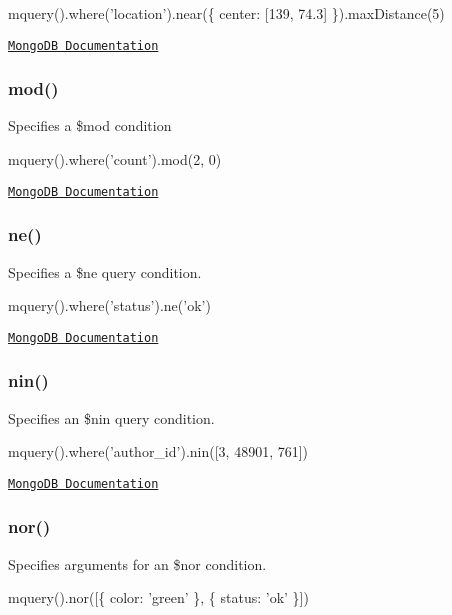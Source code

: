 \begin{DoxyCode}
mquery().where('location').near(\{ center: [139, 74.3] \}).maxDistance(5)
\end{DoxyCode}


\href{http://docs.mongodb.org/manual/reference/operator/maxDistance/}{\tt Mongo\+DB Documentation}

\subsubsection*{mod()}

Specifies a {\ttfamily \$mod} condition


\begin{DoxyCode}
mquery().where('count').mod(2, 0)
\end{DoxyCode}


\href{http://docs.mongodb.org/manual/reference/operator/mod/}{\tt Mongo\+DB Documentation}

\subsubsection*{ne()}

Specifies a {\ttfamily \$ne} query condition.


\begin{DoxyCode}
mquery().where('status').ne('ok')
\end{DoxyCode}


\href{http://docs.mongodb.org/manual/reference/operator/ne/}{\tt Mongo\+DB Documentation}

\subsubsection*{nin()}

Specifies an {\ttfamily \$nin} query condition.


\begin{DoxyCode}
mquery().where('author\_id').nin([3, 48901, 761])
\end{DoxyCode}


\href{http://docs.mongodb.org/manual/reference/operator/nin/}{\tt Mongo\+DB Documentation}

\subsubsection*{nor()}

Specifies arguments for an {\ttfamily \$nor} condition.


\begin{DoxyCode}
mquery().nor([\{ color: 'green' \}, \{ status: 'ok' \}])
\end{DoxyCode}


